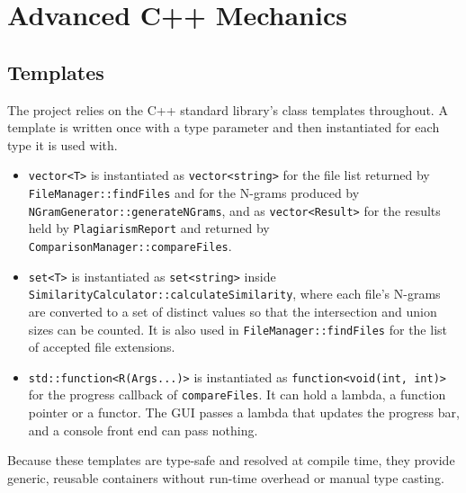 \documentclass[12pt,a4paper,oneside]{book}
\begin{document}
\section{Advanced C++ Mechanics}
\subsection{Templates}
The project relies on the C++ standard library's class templates throughout. A template is written once with a type parameter and then instantiated for each type it is used with.
\begin{itemize}
  \item \texttt{vector<T>} is instantiated as \texttt{vector<string>} for the file list returned by \texttt{FileManager::findFiles} and for the N-grams produced by \texttt{NGramGenerator::generateNGrams}, and as \texttt{vector<Result>} for the results held by \texttt{PlagiarismReport} and returned by \texttt{ComparisonManager::compareFiles}.
  \item \texttt{set<T>} is instantiated as \texttt{set<string>} inside \texttt{SimilarityCalculator::calculateSimilarity}, where each file's N-grams are converted to a set of distinct values so that the intersection and union sizes can be counted. It is also used in \texttt{FileManager::findFiles} for the list of accepted file extensions.
  \item \texttt{std::function<R(Args...)>} is instantiated as \texttt{function<void(int, int)>} for the progress callback of \texttt{compareFiles}. It can hold a lambda, a function pointer or a functor. The GUI passes a lambda that updates the progress bar, and a console front end can pass nothing.
\end{itemize}
Because these templates are type-safe and resolved at compile time, they provide generic, reusable containers without run-time overhead or manual type casting.
\end{document}
